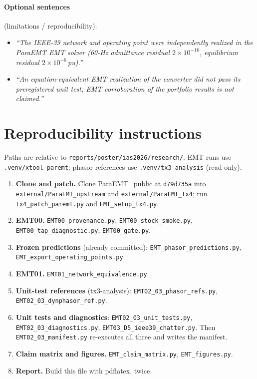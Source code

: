 \documentclass[10pt,a4paper]{article}
\newcommand{\f}[1]{\nolinkurl{#1}}
\begin{document}
\paragraph{Optional sentences} (limitations / reproducibility):
\begin{itemize}
\item \emph{``The IEEE-39 network and operating point were independently
  realized in the ParaEMT EMT solver (60-Hz admittance residual
  $2\times10^{-16}$, equilibrium residual $2\times10^{-6}$\,pu).''}
\item \emph{``An equation-equivalent EMT realization of the converter did not
  pass its preregistered unit test; EMT corroboration of the portfolio results
  is not claimed.''}
\end{itemize}

\section{Reproducibility instructions}

Paths are relative to \f{reports/poster/ias2026/research/}. EMT runs use
\f{.venv/xtool-paremt}; phasor references use \f{.venv/tx3-analysis}
(read-only).
\begin{enumerate}
\item \textbf{Clone and patch.} Clone ParaEMT\_public at \texttt{d79d735a}
  into \f{external/ParaEMT_upstream} and \f{external/ParaEMT_tx4}; run
  \f{tx4_patch_paremt.py} and \f{EMT_setup_tx4.py}.
\item \textbf{EMT00.} \f{EMT00_provenance.py}, \f{EMT00_stock_smoke.py},
  \f{EMT00_tap_diagnostic.py}, \f{EMT00_gate.py}.
\item \textbf{Frozen predictions} (already committed):
  \f{EMT_phasor_predictions.py}, \f{EMT_export_operating_points.py}.
\item \textbf{EMT01.} \f{EMT01_network_equivalence.py}.
\item \textbf{Unit-test references} (tx3-analysis): \f{EMT02_03_phasor_refs.py},
  \f{EMT02_03_dynphasor_ref.py}.
\item \textbf{Unit tests and diagnostics}: \f{EMT02_03_unit_tests.py},
  \f{EMT02_03_diagnostics.py}, \f{EMT03_D5_ieee39_chatter.py}. Then
  \f{EMT02_03_manifest.py} re-executes all three and writes the manifest.
\item \textbf{Claim matrix and figures.} \f{EMT_claim_matrix.py},
  \f{EMT_figures.py}.
\item \textbf{Report.} Build this file with pdflatex, twice.
\end{enumerate}
\end{document}
